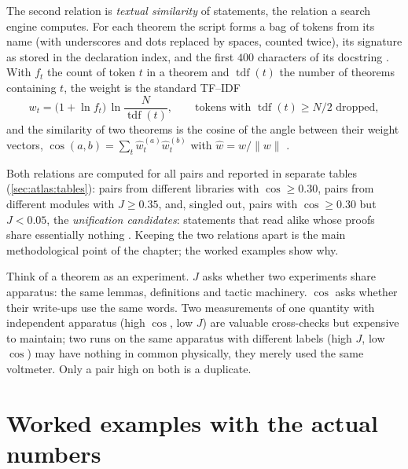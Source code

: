 The second relation is \emph{textual similarity} of statements, the relation a search
engine computes. For each theorem the script forms a bag of tokens from its name (with
underscores and dots replaced by spaces, counted twice), its signature as stored in the
declaration index, and the first $400$ characters of its docstring
. With $f_t$ the count of token $t$ in a theorem
and $\operatorname{tdf}(t)$ the number of theorems containing $t$, the weight is the
standard TF--IDF
\begin{equation}\label{eq:atlas:tfidf}
  w_t=\bigl(1+\ln f_t\bigr)\,\ln\frac{N}{\operatorname{tdf}(t)},
  \qquad\text{tokens with }\operatorname{tdf}(t)\ge N/2\text{ dropped},
\end{equation}
and the similarity of two theorems is the cosine of the angle between their weight
vectors, $\cos(a,b)=\sum_t \hat w^{(a)}_t\hat w^{(b)}_t$ with $\hat w=w/\|w\|$
.

Both relations are computed for all pairs and reported in separate tables
(\cref{sec:atlas:tables}): pairs from different libraries with $\cos\ge0.30$, pairs from
different modules with $J\ge0.35$, and, singled out, pairs with $\cos\ge0.30$ but
$J<0.05$, the \emph{unification candidates}: statements
that read alike whose proofs share essentially nothing
. Keeping the two relations apart is the main
methodological point of the chapter; the worked examples show why.

\begin{physicsbox}
Think of a theorem as an experiment. $J$ asks whether two experiments share apparatus:
the same lemmas, definitions and tactic machinery. $\cos$ asks whether their write-ups
use the same words. Two measurements of one quantity with independent apparatus (high
$\cos$, low $J$) are valuable cross-checks but expensive to maintain; two runs on the
same apparatus with different labels (high $J$, low $\cos$) may have nothing in common
physically, they merely used the same voltmeter. Only a pair high on both is a duplicate.
\end{physicsbox}

\section{Worked examples with the actual numbers}\label{sec:atlas:examples}

